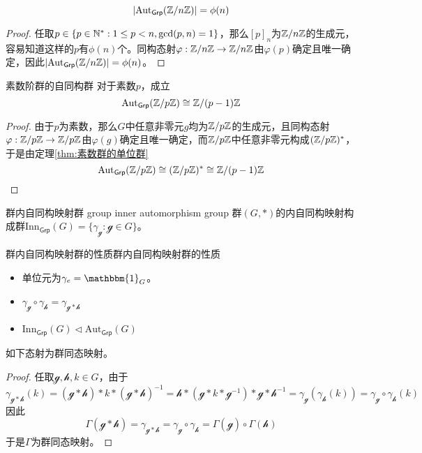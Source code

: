 \begin{proposition}
	\[ 
	|\mathrm{Aut}_{\mathsf{Grp}}(\mathbb{Z}/n\mathbb{Z})|=\phi(n)
	 \]
\end{proposition}

\begin{proof}
	任取$p\in\{ p\in\mathbb{N}^*:1\le p<n,\mathrm{gcd}(p,n)=1 \}$，那么$[p]_n$为$\mathbb{Z}/n\mathbb{Z}$的生成元，容易知道这样的$p$有$\phi(n)$个。同构态射$\varphi:\mathbb{Z}/n\mathbb{Z}\to \mathbb{Z}/n\mathbb{Z}$由$\varphi(p)$确定且唯一确定，因此$|\mathrm{Aut}_{\mathsf{Grp}}(\mathbb{Z}/n\mathbb{Z})|=\phi(n)$。
\end{proof}

\begin{proposition}{}{素数阶群的自同构群}
	对于素数$p$，成立
	\[ 
	\mathrm{Aut}_{\mathsf{Grp}}(\mathbb{Z}/p\mathbb{Z})\cong \mathbb{Z}/(p-1)\mathbb{Z}
	 \]
\end{proposition}

\begin{proof}
	由于$p$为素数，那么$G$中任意非零元$g$均为$\mathbb{Z}/p\mathbb{Z}$的生成元，且同构态射$\varphi:\mathbb{Z}/p\mathbb{Z}\to \mathbb{Z}/p\mathbb{Z}$由$\varphi(g)$确定且唯一确定，而$\mathbb{Z}/p\mathbb{Z}$中任意非零元构成$(\mathbb{Z}/p\mathbb{Z})^*$，于是由定理\ref{thm:素数群的单位群}
	\[ 
	\mathrm{Aut}_{\mathsf{Grp}}(\mathbb{Z}/p\mathbb{Z})
	\cong(\mathbb{Z}/p\mathbb{Z})^*
	\cong \mathbb{Z}/(p-1)\mathbb{Z}
	 \]
\end{proof}

\begin{definition}{群内自同构映射群 group inner automorphism group}
	群$(G,*)$的内自同构映射构成群$\mathrm{Inn}_{\mathsf{Grp}}(G)=\{ \gamma_\mathcal{g}:\mathcal{g}\in G \}$。
\end{definition}

\begin{proposition}{群内自同构映射群的性质}{群内自同构映射群的性质}
	\begin{itemize}
		\item 单位元为$\gamma_{e}=\mathbbm{1}_G$。
		\item $\gamma_{\mathcal{g}}\circ \gamma_{\mathcal{h}}=\gamma_{\mathcal{g}*\mathcal{h}}$
		\item $\mathrm{Inn}_{\mathsf{Grp}}(G)\lhd \mathrm{Aut}_{\mathsf{Grp}}(G)$
	\end{itemize}
\end{proposition}

\begin{proposition}
	如下态射为群同态映射。
\end{proposition}

\begin{proof}
	任取$\mathcal{g},\mathcal{h},k\in G$，由于
	\[ \gamma_{\mathcal{g*h}}(k)
	=(\mathcal{g*h})*k*(\mathcal{g*h})^{-1}
	=\mathcal{h}*(\mathcal{g}*k*\mathcal{g}^{-1})*\mathcal{g*h}^{-1}
	=\gamma_{\mathcal{g}}( \gamma_{\mathcal{h}}(k))=\gamma_{\mathcal{g}}\circ \gamma_{\mathcal{h}}(k)
	\]
	因此
	\[ \Gamma(\mathcal{g}*\mathcal{h})=\gamma_{\mathcal{g*h}}=\gamma_{\mathcal{g}}\circ \gamma_{\mathcal{h}}=\Gamma(\mathcal{g})\circ\Gamma(\mathcal{h})
	\]
	于是$\Gamma$为群同态映射。
\end{proof}

